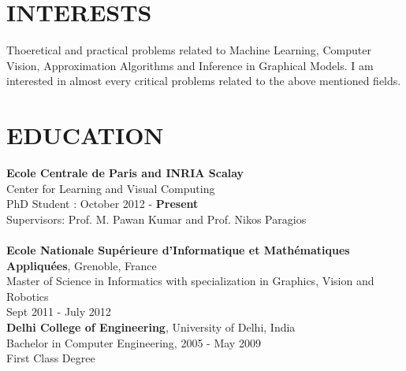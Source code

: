 \documentclass{res}
\begin{document}
        \begin{resume}

\section{INTERESTS} Thoeretical and practical problems related to Machine Learning, Computer Vision, Approximation Algorithms and Inference in Graphical Models. I am interested in almost every critical problems related to the above mentioned fields. 

        \section{EDUCATION} 
{\bf Ecole Centrale de Paris and INRIA Scalay}\\ Center for Learning and Visual Computing\\ PhD Student : October 2012 - {\bf Present}\\ Supervisors: Prof. M. Pawan Kumar and Prof. Nikos Paragios \\  \\
{\bf Ecole Nationale Supérieure d'Informatique et Mathématiques Appliquées}, Grenoble, France  \\        
Master of Science in Informatics with specialization in Graphics, Vision and Robotics\\ Sept 2011 - July 2012   \\  
{\bf Delhi College of Engineering}, University of Delhi, India       \\   
Bachelor in Computer Engineering, 2005 - May 2009  \\        
First Class Degree          

\vspace{-5pt}

\end{resume}
\end{document}
